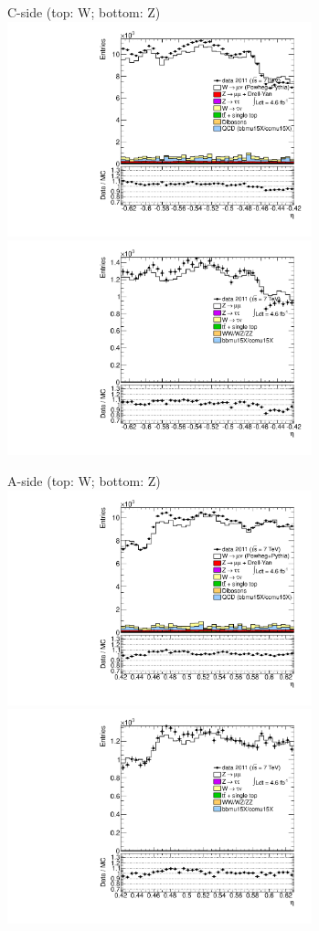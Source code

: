 {

\colb[T]

C-side (top: W; bottom: Z)
\centering
\includegraphics[width=0.66\textwidth]{dates/20130306/figures/etaphi/W_3_C_stack_l_eta_POS} \\
\includegraphics[width=0.66\textwidth]{dates/20130306/figures/etaphi/Z_3_C_stack_lP_eta_ALL.pdf}

A-side (top: W; bottom: Z)
\centering
\includegraphics[width=0.66\textwidth]{dates/20130306/figures/etaphi/W_3_A_stack_l_eta_POS} \\
\includegraphics[width=0.66\textwidth]{dates/20130306/figures/etaphi/Z_3_A_stack_lP_eta_ALL.pdf} 

\cole
}


